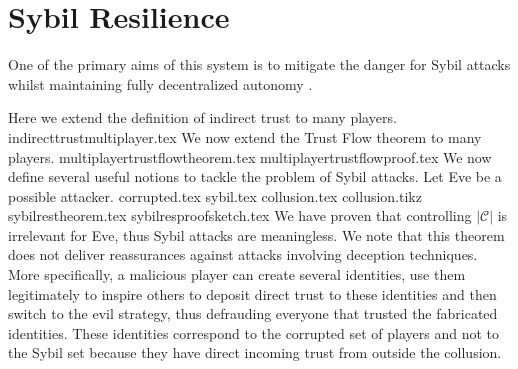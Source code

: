 \section{Sybil Resilience}
  One of the primary aims of this system is to mitigate the danger for Sybil attacks \cite{sybilattack} whilst maintaining
  fully decentralized autonomy \cite{dinoyziz}.

  Here we extend the definition of indirect trust to many players.
  {indirecttrustmultiplayer.tex}
  \noindent We now extend the Trust Flow theorem to many players.
  {multiplayertrustflowtheorem.tex}
  {multiplayertrustflowproof.tex}
  \noindent We now define several useful notions to tackle the problem of Sybil attacks. Let Eve be a possible attacker.
  {corrupted.tex}
  {sybil.tex}
  {collusion.tex}
  {collusion.tikz}
  {sybilrestheorem.tex}
  {sybilresproofsketch.tex}
  We have proven that controlling $|\mathcal{C}|$ is irrelevant for Eve, thus Sybil attacks are meaningless. We note that
  this theorem does not deliver reassurances against attacks involving deception techniques. More specifically, a malicious
  player can create several identities, use them legitimately to inspire others to deposit direct trust to these identities
  and then switch to the evil strategy, thus defrauding everyone that trusted the fabricated identities. These identities
  correspond to the corrupted set of players and not to the Sybil set because they have direct incoming trust from outside
  the collusion.

